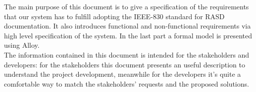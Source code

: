 The main purpose of this document is to give a specification of the requirements that our system has to fulfill adopting the IEEE-830 standard for RASD documentation. 
It also introduces functional and non-functional requirements via high level specification of the system. 
In the last part a formal model is presented using Alloy. 
\\The information contained in this document is intended for the stakeholders and developers: for the stakeholders this document presents an useful description to understand the project development, 
meanwhile for the developers it's quite a comfortable way to match the stakeholders' requests and the proposed solutions.
